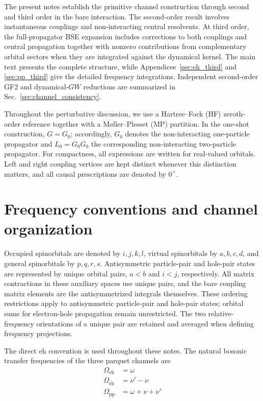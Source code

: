 \documentclass[aip,jcp,reprint,noshowkeys,superscriptaddress]{revtex4-1}
\newcommand{\eh}{\text{eh}}
\newcommand{\teh}{\overline{\text{eh}}}
\newcommand{\pp}{\text{pp}}
\begin{document}
The present notes establish the primitive channel construction through
second and third order in the bare interaction.
The second-order result involves instantaneous couplings and non-interacting
central resolvents. At third order, the full-propagator BSE expansion
includes corrections to both couplings and central propagation together
with nonzero contributions from complementary orbital sectors when
they are integrated against the dynamical kernel.
The main text presents the complete structure, while Appendices~\ref{sec:eh_third}
and \ref{sec:pp_third} give the detailed frequency integrations.
Independent second-order GF2 and dynamical-$GW$ reductions are summarized
in Sec.~\ref{sec:channel_consistency}.

Throughout the perturbative discussion, we use a Hartree--Fock (HF) zeroth-order
reference together with a M{\o}ller--Plesset (MP) partition.
In the one-shot construction, $G=G_0$; accordingly, $G_0$ denotes the non-interacting one-particle propagator and
$L_0=G_0G_0$ the corresponding non-interacting two-particle propagator.
For compactness, all expressions are written for real-valued orbitals.
Left and right coupling vertices are kept distinct whenever this distinction
matters, and all causal prescriptions are denoted by $0^+$.

\section{Frequency conventions and channel organization}
\label{sec:frequencies}


Occupied spinorbitals are denoted by $i,j,k,l$, virtual spinorbitals by
$a,b,c,d$, and general spinorbitals by $p,q,r,s$.
Antisymmetric particle-pair and hole-pair states are represented by unique
orbital pairs, $a<b$ and $i<j$, respectively.
All matrix contractions in these auxiliary spaces use unique pairs,
and the bare coupling matrix elements are the antisymmetrized integrals themselves.
These ordering restrictions apply to antisymmetric particle-pair and hole-pair
states; orbital sums for electron-hole propagation remain unrestricted.
The two relative-frequency orientations of a unique pair are retained and
averaged when defining frequency projections.

The direct $\eh$ convention is used throughout these notes.
The natural bosonic transfer frequencies of the three parquet channels are\cite{OrlandoRomanielloLoos2023,MarieLoos2025}
\begin{align}
	\Omega_\eh
	&=
	\omega
	\label{eq:Omega_eh}
	\\
	\Omega_{\teh}
	&=
	\nu'-\nu
	\label{eq:Omega_ehbar}
	\\
	\Omega_\pp
	&=
	\omega+\nu+\nu'
	\label{eq:Omega_pp}
\end{align}
\end{document}
